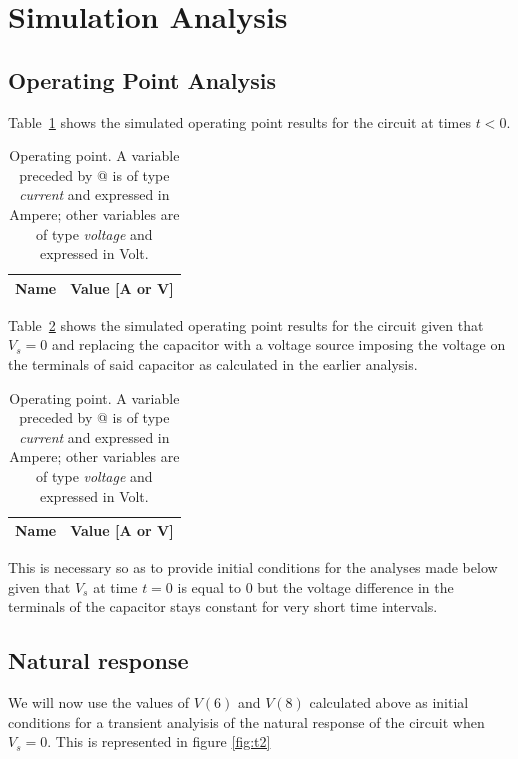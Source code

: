 \section{Simulation Analysis}
\label{sec:simulation}

\subsection{Operating Point Analysis}

Table~\ref{tab:p1} shows the simulated operating point results for the circuit
at times $t<0$.

\begin{table}[H]
  \centering
  \begin{tabular}{|l|r|}
    \hline    
    {\bf Name} & {\bf Value [A or V]} \\ \hline
    
  \end{tabular}
  \caption{Operating point. A variable preceded by @ is of type {\em current}
    and expressed in Ampere; other variables are of type {\it voltage} and expressed in
    Volt.}
  \label{tab:p1}
\end{table}

Table~\ref{tab:p2} shows the simulated operating point results for the circuit
given that $V_s=0$ and replacing the capacitor with a
voltage source imposing the voltage on the terminals of said capacitor
as calculated in the earlier analysis.

\begin{table}[H]
    \centering
    \begin{tabular}{|l|r|}
      \hline    
      {\bf Name} & {\bf Value [A or V]} \\ \hline
      
    \end{tabular}
    \caption{Operating point. A variable preceded by @ is of type {\em current}
      and expressed in Ampere; other variables are of type {\it voltage} and expressed in
      Volt.}
    \label{tab:p2}
  \end{table}
This is necessary so as to provide initial conditions for the analyses made below given
that $V_s$ at time $t=0$ is equal to 0 but the voltage difference in the terminals of the
capacitor stays constant for very short time intervals.
\subsection{Natural response}

We will now use the values of $V(6)$ and $V(8)$ calculated above as initial conditions
for a transient analyisis of the natural response of the circuit when $V_s=0$.
This is represented in figure \ref{fig:t2}

